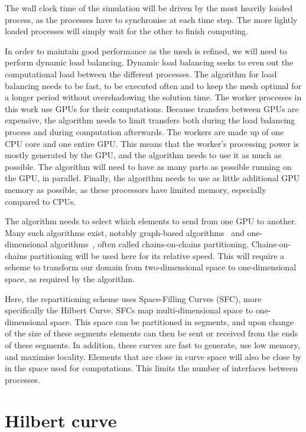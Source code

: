 The wall clock time of the simulation will be driven by the most heavily loaded process, as the
processes have to synchronise at each time step. The more lightly loaded processes will simply wait
for the other to finish computing.

In order to maintain good performance as the mesh is refined, we will need to perform dynamic load
balancing. Dynamic load balancing seeks to even out the computational load between the different
processes. The algorithm for load balancing needs to be fast, to be executed often and to keep the
mesh optimal for a longer period without overshadowing the solution time. The worker processes in
this work use GPUs for their computations. Because transfers between GPUs are expensive, the
algorithm needs to limit transfers both during the load balancing process and during computation
afterwards. The workers are made up of one CPU core and one entire GPU. This means that the worker's
processing power is mostly generated by the GPU, and the algorithm needs to use it as much as
possible. The algorithm will need to have as many parts as possible running on the GPU, in parallel.
Finally, the algorithm needs to use as little additional GPU memory as possible, as these processors
have limited memory, especially compared to CPUs.

The algorithm needs to select which elements to send from one GPU to another. Many such algorithms
exist, notably graph-based algorithms~\cite{Karypis1998} and one-dimensional
algorithms~\cite{Pinar2004}, often called chains-on-chains partitioning. Chains-on-chains
partitioning will be used here for its relative speed. This will require a scheme to transform our
domain from two-dimensional space to one-dimensional space, as required by the algorithm.

Here, the repartitioning scheme uses Space-Filling Curves (SFC), more specifically the Hilbert
Curve. SFCs map multi-dimensional space to one-dimensional space. This space can be partitioned in
segments, and upon change of the size of these segments elements can then be sent or received from
the ends of these segments. In addition, these curves are fast to generate, use low memory, and
maximise locality. Elements that are close in curve space will also be close by in the space used
for computations. This limits the number of interfaces between processes.

\section{Hilbert curve} \label{section:load_balancing:hilbert_curve}

